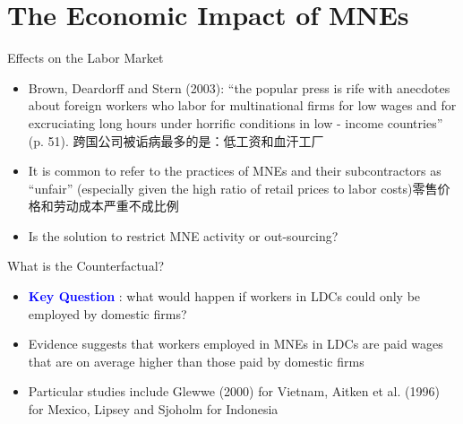 \documentclass[10pt,hyperref={CJKbookmarks=true},xcolor=dvipsnames,aspectratio=169]{beamer}
\begin{document}
\section{The Economic Impact of MNEs }
\begin{frame}{Effects on the Labor Market}

\begin{itemize}
\item Brown, Deardorff and Stern (2003): “the popular press is rife with
anecdotes about foreign workers who labor for multinational firms
for low wages and for excruciating long hours under horrific conditions
in low - income countries” (p. 51). 跨国公司被诟病最多的是：低工资和血汗工厂
\item It is common to refer to the practices of MNEs and their subcontractors
as “unfair” (especially given the high ratio of retail prices to labor
costs)零售价格和劳动成本严重不成比例 
\item Is the solution to restrict MNE activity or out-sourcing? 
\end{itemize}
\end{frame}

\begin{frame}{What is the Counterfactual?}

\begin{itemize}
\item \textbf{\textcolor{blue}{Key Question}} : what would happen if workers
in LDCs could only be employed by domestic firms? 
\item Evidence suggests that workers employed in MNEs in LDCs are paid wages
that are on average higher than those paid by domestic firms 
\item Particular studies include Glewwe (2000) for Vietnam, Aitken et al.
(1996) for Mexico, Lipsey and Sjoholm for Indonesia
\end{itemize}
\end{frame}
\end{document}
